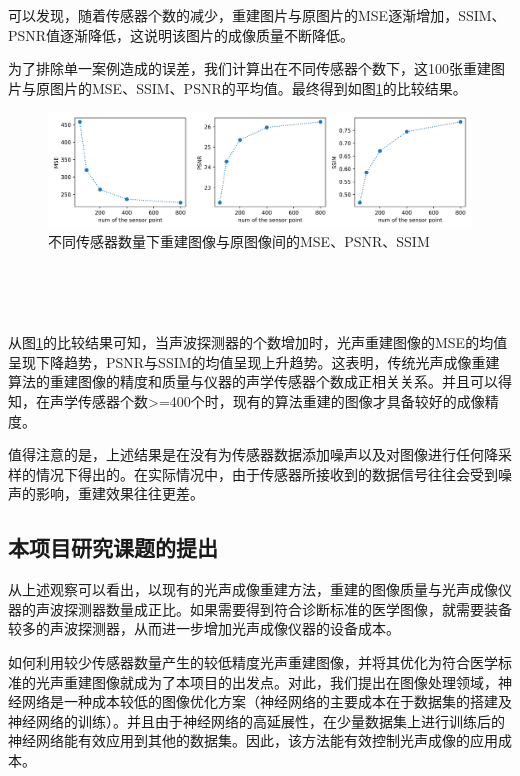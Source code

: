 可以发现，随着传感器个数的减少，重建图片与原图片的MSE逐渐增加，SSIM、PSNR值逐渐降低，这说明该图片的成像质量不断降低。

为了排除单一案例造成的误差，我们计算出在不同传感器个数下，这100张重建图片与原图片的MSE、SSIM、PSNR的平均值。最终得到如图\ref{img103}的比较结果。

\begin{figure}[h]
	\centering
	\includegraphics[width=0.9\columnwidth]{image/chap01/img_1_03.png}
	\caption{不同传感器数量下重建图像与原图像间的MSE、PSNR、SSIM}
	\label{img103}
\end{figure}

\hspace*{\fill} \

\hspace*{\fill} \

从图\ref{img103}的比较结果可知，当声波探测器的个数增加时，光声重建图像的MSE的均值呈现下降趋势，PSNR与SSIM的均值呈现上升趋势。这表明，传统光声成像重建算法的重建图像的精度和质量与仪器的声学传感器个数成正相关关系。并且可以得知，在声学传感器个数>=400个时，现有的算法重建的图像才具备较好的成像精度。

值得注意的是，上述结果是在没有为传感器数据添加噪声以及对图像进行任何降采样的情况下得出的。在实际情况中，由于传感器所接收到的数据信号往往会受到噪声的影响，重建效果往往更差。

\subsection{本项目研究课题的提出}
从上述观察可以看出，以现有的光声成像重建方法，重建的图像质量与光声成像仪器的声波探测器数量成正比。如果需要得到符合诊断标准的医学图像，就需要装备较多的声波探测器，从而进一步增加光声成像仪器的设备成本。

 如何利用较少传感器数量产生的较低精度光声重建图像，并将其优化为符合医学标准的光声重建图像就成为了本项目的出发点。对此，我们提出在图像处理领域，神经网络是一种成本较低的图像优化方案（神经网络的主要成本在于数据集的搭建及神经网络的训练）。并且由于神经网络的高延展性，在少量数据集上进行训练后的神经网络能有效应用到其他的数据集。因此，该方法能有效控制光声成像的应用成本。
 
